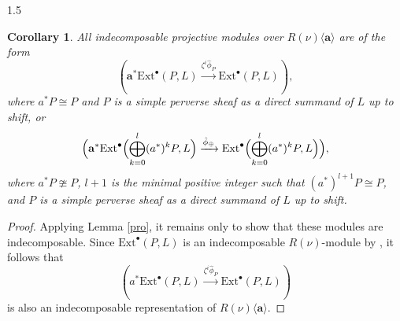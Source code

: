 \documentclass[10pt]{amsart}
\newtheorem{corollary}[theorem]{Corollary}
\begin{document}
\begin{spacing}{1.5}
\begin{corollary}\label{apro}
All indecomposable projective modules over $R(\nu)\langle\mathbf{a}\rangle$ are of the form
\[
(\mathbf{a}^* \mathrm{Ext}^{\bullet}(P, L) \xrightarrow{\zeta^i \hat{\phi}_P} \mathrm{Ext}^{\bullet}(P, L)),
\]
where $a^* P \cong P$ and $P$ is a simple perverse sheaf as a direct summand of $L$ up to shift, or
\[
\Bigl( \mathbf{a}^* \mathrm{Ext}^{\bullet}\Bigl( \bigoplus_{k=0}^{l} (a^*)^k P, L \Bigr) 
\xrightarrow{\hat{\phi}_{\oplus}} 
\mathrm{Ext}^{\bullet}\Bigl( \bigoplus_{k=0}^{l} (a^*)^k P, L \Bigr) \Bigr),
\]
where $a^* P \ncong P$, $l+1$ is the minimal positive integer such that $(a^*)^{l+1} P \cong P$, and $P$ is a simple perverse sheaf as a direct summand of $L$ up to shift.
\end{corollary}

\begin{proof}
Applying Lemma \ref{pro}, it remains only to show that these modules are indecomposable. Since $\mathrm{Ext}^{\bullet}(P, L)$ is an indecomposable $R(\nu)$-module by \cite[Theorem 4.4]{VaragnoloVasserot+2011+67+100}, it follows that
\[
(a^* \mathrm{Ext}^{\bullet}(P, L) \xrightarrow{\zeta^i \hat{\phi}_P} \mathrm{Ext}^{\bullet}(P, L))
\]
is also an indecomposable representation of $R(\nu)\langle\mathbf{a}\rangle$.


\end{proof}
\end{spacing}
\end{document}
